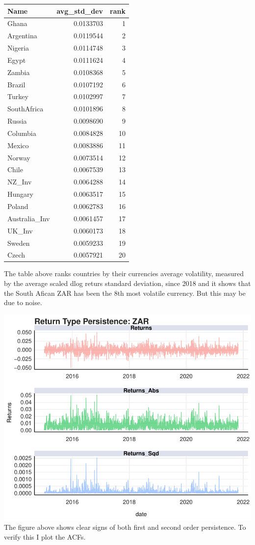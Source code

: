 \documentclass[12pt,preprint, authoryear]{elsarticle}
\numberwithin{equation}{section}
\numberwithin{figure}{section}
\numberwithin{table}{section}
\begin{document}
\begin{tabular}{l|r|r}
\hline
Name & avg\_std\_dev & rank\\
\hline
Ghana & 0.0133703 & 1\\
\hline
Argentina & 0.0119544 & 2\\
\hline
Nigeria & 0.0114748 & 3\\
\hline
Egypt & 0.0111624 & 4\\
\hline
Zambia & 0.0108368 & 5\\
\hline
Brazil & 0.0107192 & 6\\
\hline
Turkey & 0.0102997 & 7\\
\hline
SouthAfrica & 0.0101896 & 8\\
\hline
Russia & 0.0098690 & 9\\
\hline
Columbia & 0.0084828 & 10\\
\hline
Mexico & 0.0083886 & 11\\
\hline
Norway & 0.0073514 & 12\\
\hline
Chile & 0.0067539 & 13\\
\hline
NZ\_Inv & 0.0064288 & 14\\
\hline
Hungary & 0.0063517 & 15\\
\hline
Poland & 0.0062783 & 16\\
\hline
Australia\_Inv & 0.0061457 & 17\\
\hline
UK\_Inv & 0.0060173 & 18\\
\hline
Sweden & 0.0059233 & 19\\
\hline
Czech & 0.0057921 & 20\\
\hline
\end{tabular}

The table above ranks countries by their currencies average volatility,
measured by the average scaled dlog returs standard deviation, since
2018 and it shows that the South Afican ZAR has been the 8th most
volatile currency. But this may be due to noise.

\includegraphics{Question-5_files/figure-latex/unnamed-chunk-3-1.pdf}
The figure above shows clear signs of both first and second order
persistence. To verify this I plot the ACFs.
\end{document}

